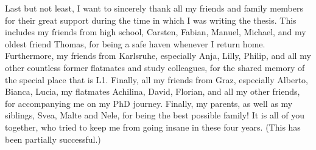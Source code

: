 \documentclass[twoside,openright,bibliography=totoc]{scrreprt}
\begin{document}
Last but not least, I want to sincerely thank all my friends and family members for their great support during the time in which I was writing the thesis. 
This includes my friends from high school, Carsten, Fabian, Manuel, Michael, and my oldest friend Thomas, for being a safe haven whenever I return home. 
Furthermore, my friends from Karlsruhe, especially Anja, Lilly, Philip, and all my other countless former flatmates and study colleagues, for the shared memory of the special place that is L1. 
Finally, all my friends from Graz, especially Alberto, Bianca, Lucia, my flatmates Achilina, David, Florian, and all my other friends, for accompanying me on my PhD journey. 
Finally, my parents, as well as my siblings, Svea, Malte and Nele, for being the best possible family! It is all of you together, who tried to keep me from going insane in these four years. (This has been partially successful.)


\cleardoublepage

\setcounter{tocdepth}{1}
\tableofcontents























\end{document}

